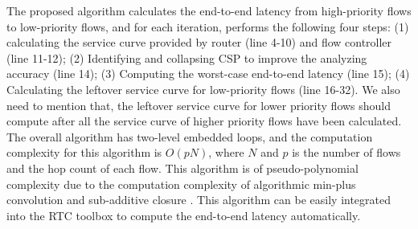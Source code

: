 \documentclass[10pt,journal]{IEEEtran}
\begin{document}
The proposed algorithm calculates the end-to-end latency from high-priority flows to low-priority flows, and for each iteration, performs the following four steps: (1) calculating the service curve provided by router (line 4-10) and flow controller (line 11-12); (2) Identifying and collapsing CSP to improve the analyzing accuracy (line 14); (3) Computing the worst-case end-to-end latency (line 15); (4) Calculating the leftover service curve for low-priority flows (line 16-32). We also need to mention that, the leftover service curve for lower priority flows should compute after all the service curve of higher priority flows have been calculated. The overall algorithm has two-level embedded loops, and the computation complexity for this algorithm is $O(pN)$, where $N$ and $p$ is the number of flows and the hop count of each flow. This algorithm is of pseudo-polynomial complexity due to the computation complexity of algorithmic min-plus convolution and sub-additive closure \cite{Bouillard2008}. This algorithm can be easily integrated into the RTC toolbox \cite{rtc} to compute the end-to-end latency automatically.
\end{document}
